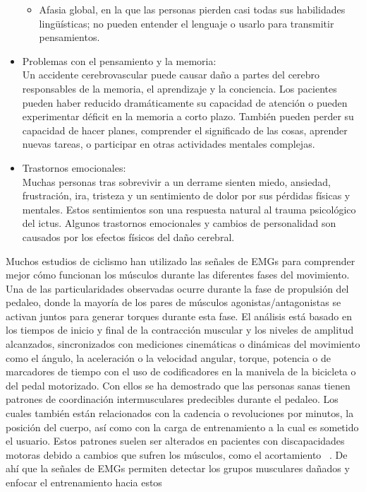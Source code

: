 \begin{itemize}
\begin{itemize}
        \item Afasia global, en la que las personas pierden casi todas sus habilidades lingüísticas; no pueden entender el lenguaje o usarlo para transmitir pensamientos.  
    \end{itemize}
    \item Problemas con el pensamiento y la memoria:\\
    Un accidente cerebrovascular puede causar daño a partes del cerebro responsables
    de la memoria, el aprendizaje y la conciencia. Los pacientes pueden haber reducido
    dramáticamente su capacidad de atención o pueden experimentar déficit en la memoria a
    corto plazo. También pueden perder su capacidad de hacer planes, comprender el
    significado de las cosas, aprender nuevas tareas, o participar en otras actividades mentales
    complejas.~\cite{post-strok}
    \item Trastornos emocionales:\\
    Muchas personas tras sobrevivir a un derrame sienten miedo, ansiedad,
    frustración, ira, tristeza y un sentimiento de dolor por sus pérdidas físicas y mentales.
    Estos sentimientos son una respuesta natural al trauma psicológico del ictus. Algunos
    trastornos emocionales y cambios de personalidad son causados por los efectos físicos
    del daño cerebral.~\cite{post-strok} 
\end{itemize}

\vspace{10pt}
Muchos estudios de ciclismo han utilizado las señales de EMGs para comprender mejor
cómo funcionan los músculos durante las diferentes fases del movimiento. Una de las
particularidades observadas ocurre durante la fase de propulsión del pedaleo, donde la
mayoría de los pares de músculos agonistas/antagonistas se activan juntos para generar
torques durante esta fase. El análisis está basado en los tiempos de inicio y final de la
contracción muscular y los niveles de amplitud alcanzados, sincronizados con mediciones
cinemáticas o dinámicas del movimiento como el ángulo, la aceleración o la velocidad
angular, torque, potencia o de marcadores de tiempo con el uso de codificadores en la
manivela de la bicicleta o del pedal motorizado. Con ellos se ha demostrado que las
personas sanas tienen patrones de coordinación intermusculares predecibles durante el
pedaleo. Los cuales también están relacionados con la cadencia o revoluciones por
minutos, la posición del cuerpo, así como con la carga de entrenamiento a la cual es
sometido el usuario. Estos patrones suelen ser alterados en pacientes con
discapacidades motoras debido a cambios que sufren los músculos, como el
acortamiento ~\cite{johnston2007biomechanical}. De ahí que la señales de EMGs permiten 
detectar los grupos musculares dañados y enfocar el entrenamiento hacia estos 
~\cite{hug2009electromyographic, kautz1998relationships}

